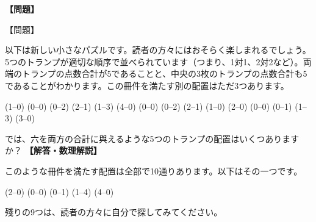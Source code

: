 \documentclass[10pt,a4paper,oneside,openany]{ltjsbook}
\begin{document}
\begin{tcolorbox}[colback=softblue,colframe=primaryblue,title=\textbf{第 379 問：五枚のトランプで六をつくる （原題: THE FIVE DOMINOES.）},arc=2mm,boxrule=1pt,breakable]
\textbf{【問題】}\par\vspace{0.3em}
【問題】

以下は新しい小さなパズルです。読者の方々にはおそらく楽しまれるでしょう。5つのトランプが適切な順序で並べられています（つまり、1対1、2対2など）。両端のトランプの点数合計が5であることと、中央の3枚のトランプの点数合計も5であることがわかります。この冊件を満たす別の配置はただ3つあります。

(1--0) (0--0) (0--2) (2--1) (1--3)
(4--0) (0--0) (0--2) (2--1) (1--0)
(2--0) (0--0) (0--1) (1--3) (3--0)

では、六を両方の合計に與えるような5つのトランプの配置はいくつありますか？
\tcblower
\textbf{【解答・数理解説】}\par\vspace{0.3em}
このような冊件を満たす配置は全部で10通りあります。以下はその一つです。

(2--0) (0--0) (0--1) (1--4) (4--0)

殘りの9つは、読者の方々に自分で探してみてください。
\end{tcolorbox}
\end{document}
